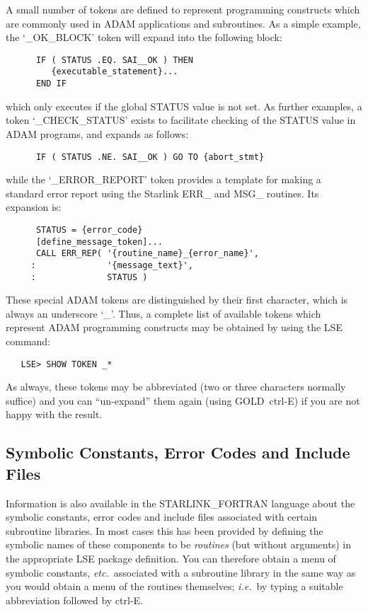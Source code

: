 A small number of tokens are defined to represent programming constructs
which are commonly used in ADAM applications and subroutines.
As a simple example, the \mbox{`\_OK\_BLOCK'} token will expand into the
following block:

\begin{verbatim}
      IF ( STATUS .EQ. SAI__OK ) THEN
         {executable_statement}...
      END IF
\end{verbatim}

which only executes if the global \mbox{STATUS} value is not set.
As further examples, a token \mbox{`\_CHECK\_STATUS'} exists to facilitate
checking of the \mbox{STATUS} value in \mbox{ADAM} programs, and expands as
follows:

\begin{verbatim}
      IF ( STATUS .NE. SAI__OK ) GO TO {abort_stmt}
\end{verbatim}

while the \mbox{`\_ERROR\_REPORT'} token provides a template for making a
standard error report using the Starlink \mbox{ERR\_} and \mbox{MSG\_}
routines.
Its expansion is:

\begin{verbatim}
      STATUS = {error_code}
      [define_message_token]...
      CALL ERR_REP( '{routine_name}_{error_name}',
     :              '{message_text}',
     :              STATUS )
\end{verbatim}

These special \mbox{ADAM} tokens are distinguished by their first character,
which is always an underscore `\_'.
Thus, a complete list of available tokens which represent \mbox{ADAM}
programming constructs may be obtained by using the \mbox{LSE} command:

\begin{verbatim}
   LSE> SHOW TOKEN _*
\end{verbatim}

As always, these tokens may be abbreviated (two or three characters normally
suffice) and you can ``un-expand'' them again (using
\mbox{GOLD}~\mbox{ctrl-E}) if you are not happy with the result.


\subsection{Symbolic Constants, Error Codes and Include Files}

Information is also available in the \mbox{STARLINK\_FORTRAN} language about
the symbolic constants, error codes and include files associated with
certain subroutine libraries.
In most cases this has been provided by defining the symbolic names of these
components to be {\em routines} (but without arguments) in the appropriate
LSE package definition.
You can therefore obtain a menu of symbolic constants, {\em etc.}\
associated with a subroutine library in the same way as you would obtain a
menu of the routines themselves; {\em i.e.}\ by typing a suitable
abbreviation followed by \mbox{ctrl-E}.


